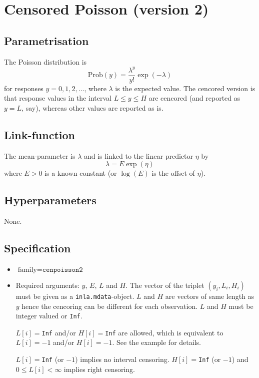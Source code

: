\documentclass[a4paper,11pt]{article}
\begin{document}
\section*{Censored Poisson (version 2)}

\subsection*{Parametrisation}

The Poisson distribution is
\begin{displaymath}
    \text{Prob}(y) = \frac{\lambda^{y}}{y!}\exp(-\lambda)
\end{displaymath}
for responses $y=0, 1, 2, \ldots$, where $\lambda$ is the expected
value.  The cencored version is that response values in the interval
$L \le y \le H$ are cencored (and reported as $y=L$, say), whereas
other values are reported as is.

\subsection*{Link-function}

The mean-parameter is $\lambda$ and is linked to the linear predictor $\eta$
by
\begin{displaymath}
    \lambda = E \exp(\eta)
\end{displaymath}
where $E>0$ is a known constant (or $\log(E)$ is the offset of $\eta$).

\subsection*{Hyperparameters}

None.

\subsection*{Specification}

\begin{itemize}
\item $\text{family}=\texttt{cenpoisson2}$
\item Required arguments: $y$, $E$, $L$ and $H$. The vector of the
    triplet $(y_i,L_i,H_i)$ must be given as a
    \texttt{inla.mdata}-object. $L$ and $H$ are vectors of same length
    as $y$ hence the cencoring can be different for each observation.
    $L$ and $H$ must be integer valued or \texttt{Inf}.

    $L[i]=$\texttt{Inf} and/or $H[i]=$\texttt{Inf} are allowed, which
    is equivalent to $L[i]= -1$ and/or $H[i] = -1$. See the example
    for details.

    $L[i]=$\texttt{Inf} (or $-1$) implies no interval censoring.
    $H[i]=$\texttt{Inf} (or $-1$) and $0\leq L[i]<\infty$ implies
    right censoring.
\end{itemize}
\end{document}
